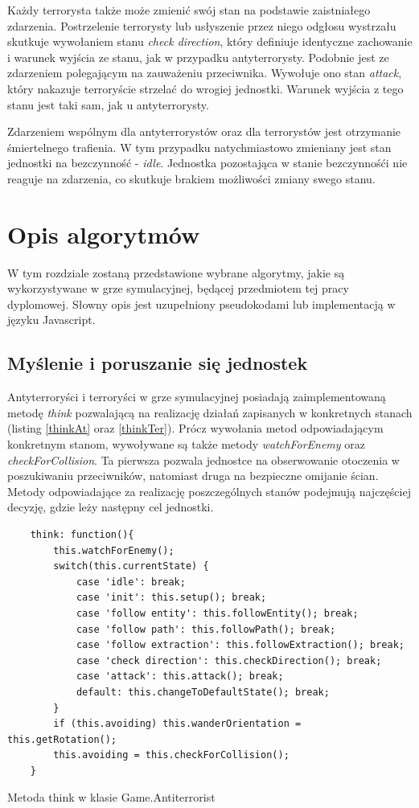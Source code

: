 Każdy terrorysta także może zmienić swój stan na podstawie zaistniałego zdarzenia. Postrzelenie terrorysty lub usłyszenie przez niego odgłosu wystrzału skutkuje wywołaniem stanu \emph{check direction}, który definiuje identyczne zachowanie i warunek wyjścia ze stanu, jak w przypadku antyterrorysty. Podobnie jest ze zdarzeniem polegającym na zauważeniu przeciwnika. Wywołuje ono stan \emph{attack}, który nakazuje terroryście strzelać do wrogiej jednostki. Warunek wyjścia z tego stanu jest taki sam, jak u antyterrorysty.

Zdarzeniem wspólnym dla antyterrorystów oraz dla terrorystów jest otrzymanie śmiertelnego trafienia. W tym przypadku natychmiastowo zmieniany jest stan jednostki na bezczynność - \emph{idle}. Jednostka pozostająca w stanie bezczynnośći nie reaguje na zdarzenia, co skutkuje brakiem możliwości zmiany swego stanu.

\section{Opis algorytmów}
W tym rozdziale zostaną przedstawione wybrane algorytmy, jakie są wykorzystywane w grze symulacyjnej, będącej przedmiotem tej pracy dyplomowej. Słowny opis jest uzupełniony pseudokodami lub implementacją w języku Javascript.

\subsection{Myślenie i poruszanie się jednostek}
Antyterroryści i terroryści w grze symulacyjnej posiadają zaimplementowaną metodę \emph{think} pozwalającą na realizację działań zapisanych w konkretnych stanach (listing \ref{thinkAt} oraz \ref{thinkTer}). Prócz wywołania metod odpowiadającym konkretnym stanom, wywoływane są także metody \emph{watchForEnemy} oraz \emph{checkForCollision}. Ta pierwsza pozwala jednostce na obserwowanie otoczenia w poszukiwaniu przeciwników, natomiast druga na bezpieczne omijanie ścian. Metody odpowiadające za realizację poszczególnych stanów podejmują najczęściej decyzję, gdzie leży następny cel jednostki.

\begin{table}
\begin{center}
\begin{lstlisting}
    think: function(){
        this.watchForEnemy();
        switch(this.currentState) {
            case 'idle': break;
            case 'init': this.setup(); break;
            case 'follow entity': this.followEntity(); break;
            case 'follow path': this.followPath(); break;
            case 'follow extraction': this.followExtraction(); break;
            case 'check direction': this.checkDirection(); break;
            case 'attack': this.attack(); break;
            default: this.changeToDefaultState(); break;
        }
        if (this.avoiding) this.wanderOrientation = this.getRotation();
        this.avoiding = this.checkForCollision();
    }
 \end{lstlisting}
\caption {Metoda think w klasie Game.Antiterrorist}
\label{thinkAt}
\end{center}
\end{table}

